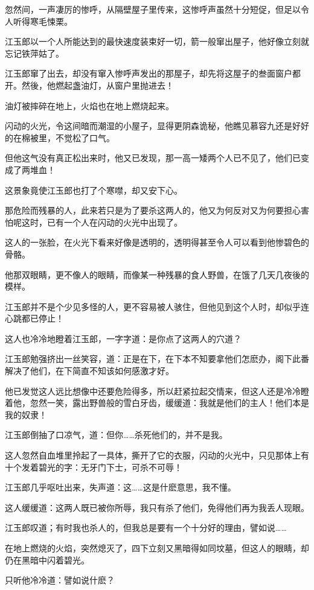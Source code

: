 \documentclass[12pt,oneside]{book}
\begin{document}
忽然间，一声凄厉的惨呼，从隔壁屋子里传来，这惨呼声虽然十分短促，但足以令人听得寒毛悚栗。

江玉郎以一个人所能达到的最快速度装束好一切，箭一般窜出屋子，他好像立刻就忘记铁萍姑了。

江玉郎窜了出去，却没有窜入惨呼声发出的那屋子，却先将这屋子的叁面窗户都开。然後，他燃起盏油灯，从窗户里抛进去！

油灯被摔碎在地上，火焰也在地上燃烧起来。

闪动的火光，令这间暗而潮湿的小屋子，显得更阴森诡秘，他瞧见慕容九还是好好的在棉被里，不觉松了口气。

但他这气没有真正松出来时，他又已发现，那一高一矮两个人已不见了，他们已变成了两堆血！

这景象竟使江玉郎也打了个寒噤，却又安下心。

那危险而残暴的人，此来若只是为了要杀这两人的，他又为何反对又为何要担心害怕呢这时，已有一个人在闪动的火光中出现了。

这人的一张脸，在火光下看来好像是透明的，透明得甚至令人可以看到他惨碧色的骨骼。

他那双眼睛，更不像人的眼睛，而像某一种残暴的食人野兽，在饿了几天几夜後的模样。

江玉郎并不是个少见多怪的人，更不容易被人骇住，但他见到这个人时，却似乎连心跳都已停止！

这人也冷冷地瞪着江玉郎，一字字道：是你点了这两人的穴道？

江玉郎勉强挤出一丝笑容，道：正是在下，在下本不知要拿他们怎麽办，阁下此番解决了他们，在下简直不知该如何感激才好。

他已发觉这人远比想像中还要危险得多，所以赶紧拉起交情来，但这人还是冷冷瞪着他，忽然一笑，露出野兽般的雪白牙齿，缓缓道：我就是他们的主人！他们本是我的奴隶！

江玉郎倒抽了口凉气，道：但你\ldots\ldots 杀死他们的，并不是我。

这人忽然自血堆里拎起了一具体，撕开了它的衣服，闪动的火光中，只见那体上有十个发着碧光的字：无牙门下士，可杀不可辱！

江玉郎几乎呕吐出来，失声道：这\ldots\ldots 这是什麽意思，我不懂。

这人缓缓道：这两人既已被你所辱，我只有杀了他们，免得他们再为我丢人现眼。

江玉郎叹道；有时我也杀人的，但我总是要有一个十分好的理由，譬如说\ldots\ldots{}

在地上燃烧的火焰，突然熄灭了，四下立刻又黑暗得如同坟墓，但这人的眼睛，却仍在黑暗中闪着碧光。

只听他冷冷道：譬如说什麽？
\end{document}
